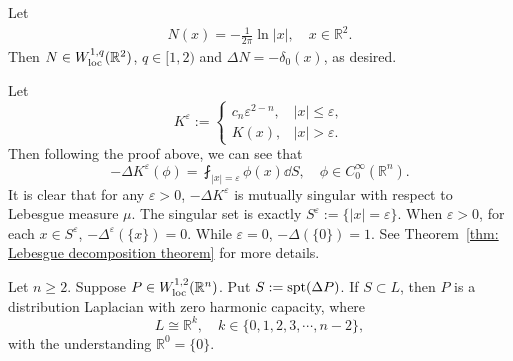 \begin{remark}
Let 
  \begin{align*}
    N(x) = -\frac{1}{2\pi}\ln|x|,\quad x\in\mathbb R^2.
  \end{align*}
Then $N\in W^{1,q}_{\operatorname*{loc}}(\mathbb R^2)$, $q\in[1,2)$ and $\Delta N = -\delta_0(x)$,
as desired.
\end{remark}

\begin{remark}
  Let 
  \[
  K^\varepsilon := 
  \begin{cases}
    c_n\varepsilon^{2-n}, & |x|\leq\varepsilon,\\
    K(x), & |x|>\varepsilon.
  \end{cases}
  \]
  Then following the proof above, we can see that 
  \[
  -\Delta K^\varepsilon(\phi) = \fint_{|x|=\varepsilon}\phi(x)\dd S,\quad \phi\in C_0^\infty(\mathbb R^n).
  \] 
  It is clear that for any $\varepsilon>0$,
  $-\Delta K^\varepsilon$ is mutually singular with respect to Lebesgue measure $\mu$.
  The singular set is exactly $S^\varepsilon := \{|x|=\varepsilon\}$.
  When $\varepsilon>0$, for each $x\in S^\varepsilon$, $-\Delta^\varepsilon(\{x\}) = 0$.
  While $\varepsilon = 0$, $-\Delta(\{0\}) = 1$. 
  See Theorem~\ref{thm: Lebesgue decomposition theorem} for more details.
\end{remark}

\begin{proposition}
  Let $n\geq2$. 
  Suppose $P\in W_{\operatorname*{loc}}^{1,2}(\mathbb R^n)$.
  Put $S:= \operatorname*{spt}(\Delta P)$.
  If $S\subset L$, 
  then $P$ is a distribution Laplacian with zero harmonic capacity,
  where
  \[
  L\cong \mathbb{R}^k,\quad k\in\{0,1,2,3,\cdots, n-2\},
  \]
  with the understanding $\mathbb R^0=\{0\}$.
\end{proposition}

